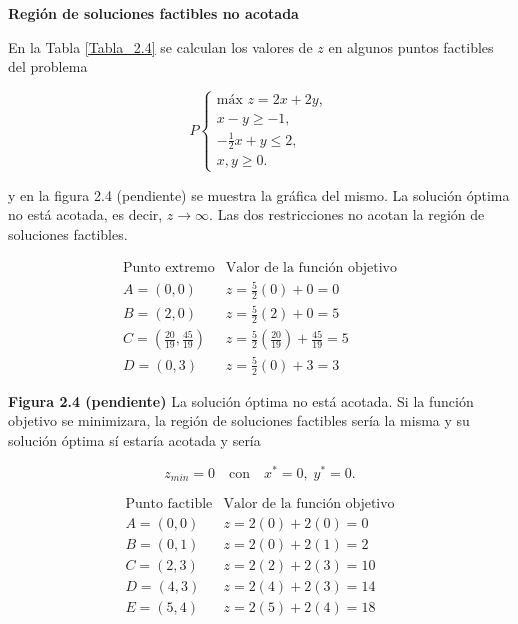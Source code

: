 \textbf{Regi\'on de soluciones factibles no acotada}
\begin{Ejem}
En la Tabla \ref{Tabla_2.4} se calculan los valores de $z$ en algunos puntos factibles del problema

\[
P
\begin{cases}
\text{m\'ax } z = 2x + 2y,\\
x - y \ge -1,\\
-\frac{1}{2}x + y \le 2,\\
x,y \ge 0.
\end{cases}
\]

y en la figura 2.4 (pendiente) se muestra la gr\'afica del mismo. La soluci\'on \'optima no est\'a acotada, es decir, $z \rightarrow \infty$. Las dos restricciones no acotan la regi\'on de soluciones factibles.

\begin{table}[h]
\centering
\[
\begin{array}{c|c}
\text{Punto extremo} & \text{Valor de la funci\'on objetivo} \\
\hline
A=(0,0) & z=\frac{5}{2}(0)+0=0 \\
B=(2,0) & z=\frac{5}{2}(2)+0=5 \\
C=\left(\frac{20}{19},\frac{45}{19}\right) & 
z=\frac{5}{2}\left(\frac{20}{19}\right)+\frac{45}{19}=5 \\
D=(0,3) & z=\frac{5}{2}(0)+3=3
\end{array}
\]
\caption{Evaluaci\'on en los puntos extremos de la regi\'on de soluciones factibles.}
\label{Tabla_2.3}
\end{table}

\textbf{Figura 2.4 (pendiente)} La soluci\'on \'optima no est\'a acotada. Si la funci\'on objetivo se minimizara, la regi\'on de soluciones factibles ser\'ia la misma y su soluci\'on \'optima s\'i estar\'ia acotada y ser\'ia

\[
z_{min}=0 \quad \text{con} \quad x^{*}=0,\; y^{*}=0.
\]


\begin{table}[h]
\centering
\[
\begin{array}{c|c}
\text{Punto factible} & \text{Valor de la funci\'on objetivo} \\
\hline
A=(0,0) & z=2(0)+2(0)=0 \\
B=(0,1) & z=2(0)+2(1)=2 \\
C=(2,3) & z=2(2)+2(3)=10 \\
D=(4,3) & z=2(4)+2(3)=14 \\
E=(5,4) & z=2(5)+2(4)=18
\end{array}
\]
\caption{Valores de $z$ en algunos puntos factibles.}
\label{Tabla_2.4}
\end{table}

\end{Ejem}

